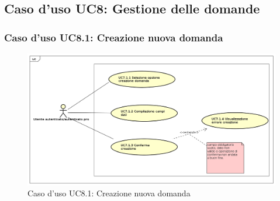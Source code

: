 \subsection{Caso d'uso UC8: Gestione delle domande}
	
\subsubsection{Caso d'uso UC8.1: Creazione nuova domanda}
	\label{UC8.1}
	\begin{figure}[h]
		\centering
			\includegraphics[scale=0.45,keepaspectratio]{UML/UC8_1.png}
		\caption{Caso d'uso UC8.1: Creazione nuova domanda}
	\end{figure}
	\FloatBarrier
